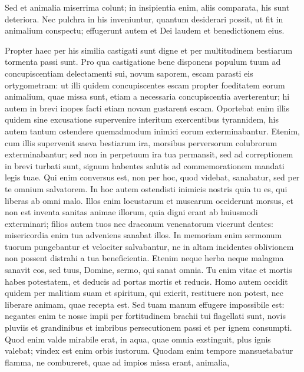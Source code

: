 \begin{biblechapter}
\begin{biblechapter}
\begin{biblechapter}
\begin{biblechapter}
\begin{biblechapter}
\begin{biblechapter}
\begin{biblechapter}
\begin{biblechapter}
\begin{biblechapter}
\begin{biblechapter}
\begin{biblechapter}
\begin{biblechapter}
\begin{biblechapter}
\begin{biblechapter}
\begin{biblechapter}
 \verse Sed et animalia miserrima colunt;
 in insipientia enim, aliis comparata, his sunt deteriora.
 \verse Nec pulchra in his inveniuntur, quantum desiderari possit,
 ut fit in animalium conspectu;
 effugerunt autem et Dei laudem et benedictionem eius.
 
\begin{biblechapter}
\verse Propter haec per his similia castigati sunt digne
 et per multitudinem bestiarum tormenta passi sunt.
 \verse Pro qua castigatione bene disponens populum tuum
 ad concupiscentiam delectamenti sui,
 novum saporem, escam parasti eis ortygometram:
 \verse ut illi quidem concupiscentes escam
 propter foeditatem eorum animalium, quae missa sunt,
 etiam a necessaria concupiscentia averterentur;
 hi autem in brevi inopes facti
 etiam novam gustarent escam.
 \verse Oportebat enim illis quidem sine excusatione
 supervenire interitum exercentibus tyrannidem,
 his autem tantum ostendere
 quemadmodum inimici eorum exterminabantur.
 \verse Etenim, cum illis supervenit saeva bestiarum ira,
 morsibus perversorum colubrorum exterminabantur;
 sed non in perpetuum ira tua permansit,
 \verse sed ad correptionem in brevi turbati sunt,
 signum habentes salutis ad commemorationem mandati legis tuae.
 \verse Qui enim conversus est, non per hoc, quod videbat, sanabatur,
 sed per te omnium salvatorem.
 \verse In hoc autem ostendisti inimicis nostris
 quia tu es, qui liberas ab omni malo.
 \verse Illos enim locustarum et muscarum occiderunt morsus,
 et non est inventa sanitas animae illorum,
 quia digni erant ab huiusmodi exterminari;
 \verse filios autem tuos nec draconum venenatorum vicerunt dentes:
 misericordia enim tua adveniens sanabat illos.
 \verse In memoriam enim sermonum tuorum
 pungebantur et velociter salvabantur,
 ne in altam incidentes oblivionem
 non possent distrahi a tua beneficientia.
 \verse Etenim neque herba neque malagma sanavit eos,
 sed tuus, Domine, sermo, qui sanat omnia.
 \verse Tu enim vitae et mortis habes potestatem,
 et deducis ad portas mortis et reducis.
 \verse Homo autem occidit quidem per malitiam suam
 et spiritum, qui exierit, restituere non potest,
 nec liberare animam, quae recepta est.
 \verse Sed tuam manum effugere impossibile est:
 \verse negantes enim te nosse impii
 per fortitudinem brachii tui flagellati sunt,
 novis pluviis et grandinibus et imbribus persecutionem passi
 et per ignem consumpti.
 \verse Quod enim valde mirabile erat,
 in aqua, quae omnia exstinguit, plus ignis valebat;
 vindex est enim orbis iustorum.
 \verse Quodam enim tempore mansuetabatur flamma,
 ne combureret, quae ad impios missa erant, animalia,

\end{biblechapter}
\end{biblechapter}
\end{biblechapter}
\end{biblechapter}
\end{biblechapter}
\end{biblechapter}
\end{biblechapter}
\end{biblechapter}
\end{biblechapter}
\end{biblechapter}
\end{biblechapter}
\end{biblechapter}
\end{biblechapter}
\end{biblechapter}
\end{biblechapter}
\end{biblechapter}
